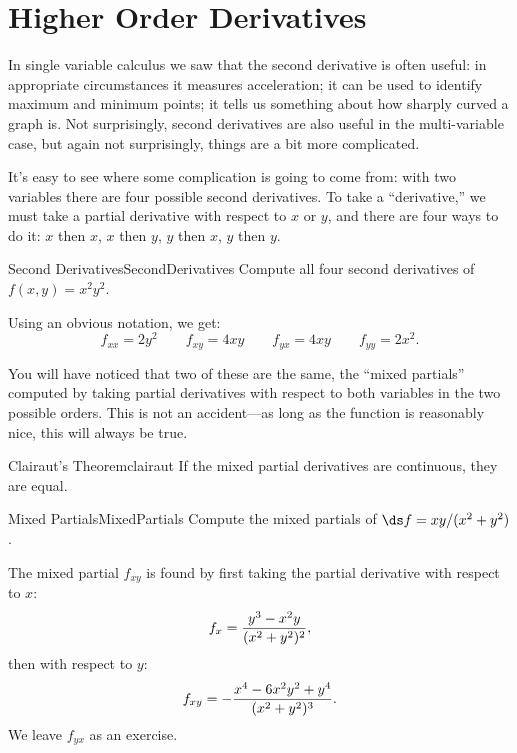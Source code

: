 \section{Higher Order Derivatives}\label{sec:MultivariateHigherOrderDerivatives}

In single variable calculus we saw that the second derivative is often
useful: in appropriate circumstances it measures acceleration; it can
be used to identify maximum and minimum points; it tells us something
about how sharply curved a graph is. Not surprisingly, second
derivatives are also useful in the multi-variable case, but again not
surprisingly, things are a bit more complicated.

It's easy to see where some complication is going to come from: with
two variables there are four possible second derivatives. To take a
``derivative,'' we must take a partial derivative with respect to $x$
or $y$, and there are four ways to do it: $x$ then $x$, $x$ then $y$, 
$y$ then $x$, $y$ then $y$.

\begin{example}{Second Derivatives}{SecondDerivatives}
Compute all four second derivatives of $f(x,y)=x^2y^2$.
\end{example}
\begin{solution}
Using an obvious notation, we get:
$$f_{xx}=2y^2\qquad f_{xy}=4xy\qquad f_{yx}=4xy\qquad f_{yy}=2x^2.$$
\end{solution}

You will have noticed that two of these are the same, the ``mixed
partials'' computed by taking partial derivatives with respect to both
variables in the two possible orders. This is not an accident---as
long as the function is reasonably nice, this will always be true.

\begin{theorem}{Clairaut's Theorem}{clairaut}
If the mixed partial derivatives are
continuous, they are equal.
\end{theorem}

\begin{example}{Mixed Partials}{MixedPartials}
Compute the mixed partials of $\ds f=xy/(x^2+y^2)$.
\end{example}
\begin{solution}
The mixed partial $f_{xy}$ is found by first taking the partial derivative with respect to $x$:
$$
f_x={y^3-x^2y\over(x^2+y^2)^2},
$$
then with respect to $y$:
$$
f_{xy}=-{x^4-6x^2y^2+y^4\over (x^2+y^2)^3}.
$$
We leave $f_{yx}$ as an exercise.
\end{solution}


